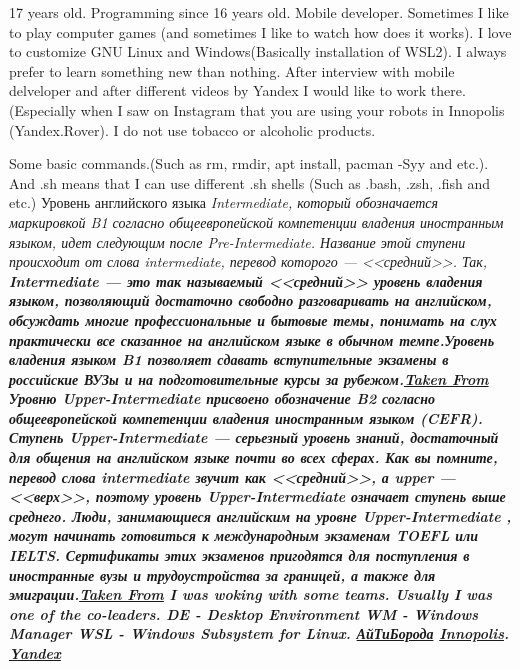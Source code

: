 \documentclass[a4paper, 12pt]{article}
\begin{document}
	17 years old. Programming since 16 years old. Mobile developer. Sometimes I like to play computer games (and sometimes I like to watch how does it works). I love to customize GNU Linux and Windows(Basically installation of WSL2\cite{WSL}). I always prefer to learn something new than nothing. After interview with mobile delveloper\cite{IT-Beard} and after different videos by Yandex I would like to work there.(Especially when I saw on Instagram that you are using your robots in Innopolis (Yandex.Rover)\cite{Rover}. I do not use tobacco or alcoholic products.
	\footnotesize
	\begin{thebibliography}{9}
		Some basic commands.(Such as rm, rmdir, apt install, pacman -Syy and etc.). And .sh means that I can use different .sh shells (Such as .bash, .zsh, .fish and etc.)
		Уровень английского языка \it Intermediate\rm, который обозначается маркировкой B1 согласно общеевропейской компетенции владения иностранным языком, идет следующим после \it Pre-Intermediate\rm. Название этой ступени происходит от слова intermediate, перевод которого — <<средний>>. Так, \bf Intermediate — это так называемый <<средний>> уровень владения языком, позволяющий достаточно свободно разговаривать на английском, обсуждать многие профессиональные и бытовые темы, понимать на слух практически все сказанное на английском языке в обычном темпе.\rm Уровень владения языком B1 позволяет сдавать вступительные экзамены в российские ВУЗы и на подготовительные курсы за рубежом.\href{https://englex.ru/level-intermediate/}{\bf Taken From}
		Уровню \it Upper-Intermediate \rm присвоено обозначение B2 согласно общеевропейской компетенции владения иностранным языком (CEFR). Ступень \it Upper-Intermediate \rm — серьезный уровень знаний, достаточный для общения на английском языке почти во всех сферах. Как вы помните, перевод слова \it intermediate \it звучит как <<средний>>, а upper — <<верх>>, поэтому уровень \it Upper-Intermediate \rm означает ступень выше среднего. Люди, занимающиеся английским на уровне \it Upper-Intermediate \rm , могут начинать готовиться к международным экзаменам \it TOEFL \rm или \it IELTS\rm. Сертификаты этих экзаменов пригодятся для поступления в иностранные вузы и трудоустройства за границей, а также для эмиграции.\href{https://englex.ru/level-upper-intermediate}{\bf Taken From}
		I was woking with some teams. Usually I was one of the co-leaders.
		DE - Desktop Environment
		WM - Windows Manager
		WSL - Windows Subsystem for Linux.
		\href{https://www.youtube.com/watch?v=j9zlTFLLrSI}{АйТиБорода}
		\href{https://www.instagram.com/p/CIkkBixFaiq/?utm_source=ig_web_copy_link}{Innopolis}. \href{https://www.instagram.com/p/CMCSzacls9b/?utm_source=ig_web_copy_link}{Yandex}
	\end{thebibliography}
\end{document}
